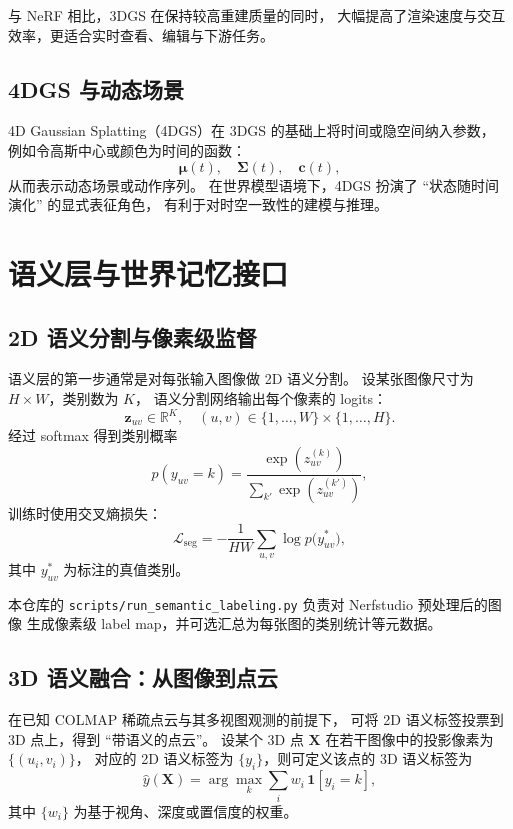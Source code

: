 \documentclass[12pt]{ctexart}
\begin{document}
与 NeRF 相比，3DGS 在保持较高重建质量的同时，
大幅提高了渲染速度与交互效率，更适合实时查看、编辑与下游任务。

\subsection{4DGS 与动态场景}

4D Gaussian Splatting（4DGS）在 3DGS 的基础上将时间或隐空间纳入参数，
例如令高斯中心或颜色为时间的函数：
\begin{equation}
  \bm{\mu}(t),\quad
  \bm{\Sigma}(t),\quad
  \bm{c}(t),
\end{equation}
从而表示动态场景或动作序列。
在世界模型语境下，4DGS 扮演了 ``状态随时间演化'' 的显式表征角色，
有利于对时空一致性的建模与推理。

\section{语义层与世界记忆接口}

\subsection{2D 语义分割与像素级监督}

语义层的第一步通常是对每张输入图像做 2D 语义分割。
设某张图像尺寸为 $H\times W$，类别数为 $K$，
语义分割网络输出每个像素的 logits：
\begin{equation}
  \bm{z}_{uv} \in \mathbb{R}^K,\quad (u,v)\in\{1,\dots,W\}\times\{1,\dots,H\}.
\end{equation}
经过 softmax 得到类别概率
\begin{equation}
  p(y_{uv}=k) = \frac{\exp(z_{uv}^{(k)})}{\sum_{k'} \exp(z_{uv}^{(k')})},
\end{equation}
训练时使用交叉熵损失：
\begin{equation}
  \mathcal{L}_\text{seg}
  = - \frac{1}{HW}
    \sum_{u,v} \log p\bigl(y_{uv}^\ast\bigr),
\end{equation}
其中 $y_{uv}^\ast$ 为标注的真值类别。

本仓库的 \texttt{scripts/run\_semantic\_labeling.py} 负责对 Nerfstudio 预处理后的图像
生成像素级 label map，并可选汇总为每张图的类别统计等元数据。

\subsection{3D 语义融合：从图像到点云}

在已知 COLMAP 稀疏点云与其多视图观测的前提下，
可将 2D 语义标签投票到 3D 点上，得到 ``带语义的点云''。
设某个 3D 点 $\bm{X}$ 在若干图像中的投影像素为 $\{(u_i,v_i)\}$，
对应的 2D 语义标签为 $\{y_i\}$，则可定义该点的 3D 语义标签为
\begin{equation}
  \hat{y}(\bm{X})
  = \arg\max_{k}
    \sum_{i} w_i \,\mathbf{1}[y_i = k],
\end{equation}
其中 $\{w_i\}$ 为基于视角、深度或置信度的权重。
\end{document}
